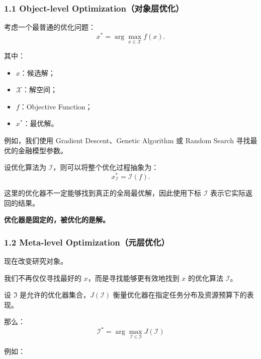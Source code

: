 \hypertarget{part-3-37-0001-object-level-optimizationux5bf9ux8c61ux5c42ux4f18ux5316}{%
\subsubsection{1.1 Object-level Optimization（对象层优化）}\label{part-3-37-0001-object-level-optimizationux5bf9ux8c61ux5c42ux4f18ux5316}}

考虑一个最普通的优化问题：
\[x^*=\arg\max_{x\in\mathcal X}f(x).\]

其中：

\begin{itemize}
\tightlist
\item
  \(x\)：候选解；
\item
  \(\mathcal X\)：解空间；
\item
  \(f\)：Objective Function；
\item
  \(x^*\)：最优解。
\end{itemize}

例如，我们使用 Gradient Descent、Genetic Algorithm 或 Random Search 寻找最优的金融模型参数。

设优化算法为 \(\mathcal I\)，则可以将整个优化过程抽象为：
\[x^*_{\mathcal I}=\mathcal I(f).\]

这里的优化器不一定能够找到真正的全局最优解，因此使用下标 \(\mathcal I\) 表示它实际返回的结果。

\textbf{优化器是固定的，被优化的是解。}

\hypertarget{part-3-37-0001-meta-level-optimizationux5143ux5c42ux4f18ux5316}{%
\subsubsection{1.2 Meta-level Optimization（元层优化）}\label{part-3-37-0001-meta-level-optimizationux5143ux5c42ux4f18ux5316}}

现在改变研究对象。

我们不再仅仅寻找最好的 \(x\)，而是寻找能够更有效地找到 \(x\) 的优化算法 \(\mathcal I\)。

设 \(\mathfrak I\) 是允许的优化器集合，\(J(\mathcal I)\) 衡量优化器在指定任务分布及资源预算下的表现。

那么：
\[\boxed{
\mathcal I^*
=
\arg\max_{\mathcal I\in\mathfrak I}
J(\mathcal I)
}\]

例如：

